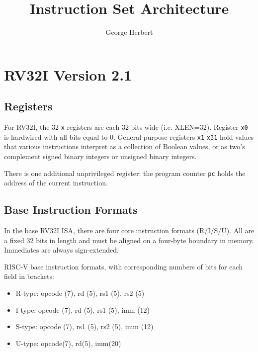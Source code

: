\documentclass{article}
\title{Instruction Set Architecture}
\author{George Herbert}
\begin{document}
\maketitle


\section{RV32I Version 2.1}

\subsection{Registers}

For RV32I, the 32 \texttt{x} registers are each 32 bits wide (i.e. XLEN=32). Register \texttt{x0} is hardwired with all bits equal to 0. General purpose registers \texttt{x1}-\texttt{x31} hold values that various instructions interpret as a collection of Boolean values, or as two's complement signed binary integers or unsigned binary integers.

There is one additional unprivileged register: the program counter \texttt{pc} holds the address of the current instruction.

\subsection{Base Instruction Formats}

In the base RV32I ISA, there are four core instruction formats (R/I/S/U). All are a fixed 32 bits in length and must be aligned on a four-byte boundary in memory. Immediates are always sign-extended.

RISC-V base instruction formats, with corresponding numbers of bits for each field in brackets:
\begin{itemize}
    \item R-type: opcode (7), rd (5), rs1 (5), rs2 (5)
    \item I-type: opcode (7), rd (5), rs1 (5), imm (12)
    \item S-type: opcode (7), rs1 (5), rs2 (5), imm (12)
    \item U-type: opcode(7), rd(5), imm(20)
\end{itemize}
\end{document}
